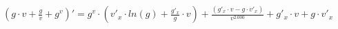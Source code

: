 \documentclass[a4paper,12pt]{article}
\begin{document}
\begin{math}
	(g \cdot v +  \frac{g}{v}  + g ^{v} )' = g ^{v}  \cdot (v'_{x}  \cdot  ln (g)  +  \frac{g'_{x} }{g}  \cdot v) +  \frac{(g'_{x}  \cdot v - g \cdot v'_{x} )}{v ^{2.000} }  + g'_{x}  \cdot v + g \cdot v'_{x} \end{math}
\end{document}
